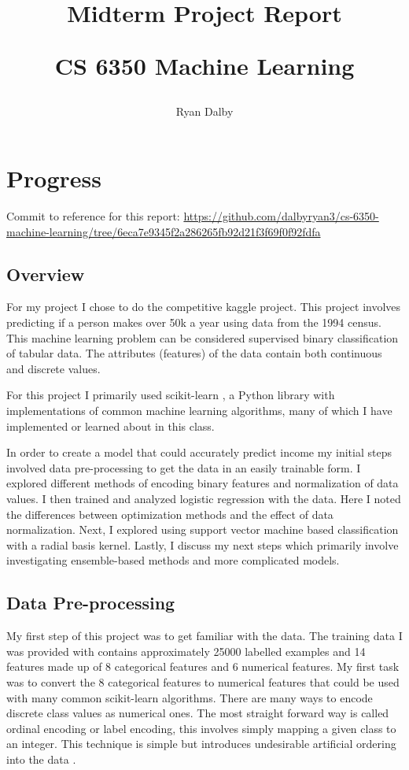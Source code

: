 \documentclass[11pt]{article}
\title{
    Midterm Project Report

    \large{
    CS 6350 Machine Learning
    }  
    
}
\author{
    Ryan Dalby
}
\date{\displaydate{date}}
\begin{document}
\maketitle

\section*{Progress}
Commit to reference for this report: \url{https://github.com/dalbyryan3/cs-6350-machine-learning/tree/6eca7e9345f2a286265fb92d21f3f69f0f92fdfa}

\subsection*{Overview}

For my project I chose to do the competitive kaggle project.
This project involves predicting if a person makes over 50k a year using data from the 1994 census. 
This machine learning problem can be considered supervised binary classification of tabular data. 
The attributes (features) of the data contain both continuous and discrete values.

For this project I primarily used scikit-learn \cite{noauthor_scikit-learn_nodate}, a Python library with implementations of common machine learning algorithms, many of which I have implemented or learned about in this class.

In order to create a model that could accurately predict income my initial steps involved data pre-processing to get the data in an easily trainable form.
I explored different methods of encoding binary features and normalization of data values.
I then trained and analyzed logistic regression with the data. 
Here I noted the differences between optimization methods and the effect of data normalization.
Next, I explored using support vector machine based classification with a radial basis kernel.
Lastly, I discuss my next steps which primarily involve investigating ensemble-based methods and more complicated models.

\subsection*{Data Pre-processing}
My first step of this project was to get familiar with the data.
The training data I was provided with contains approximately 25000 labelled examples and 14 features made up of 8 categorical features and 6 numerical features.
My first task was to convert the 8 categorical features to numerical features that could be used with many common scikit-learn algorithms.
There are many ways to encode discrete class values as numerical ones.
The most straight forward way is called ordinal encoding or label encoding, this involves simply mapping a given class to an integer.
This technique is simple but introduces undesirable artificial ordering into the data \cite{hancock_survey_2020}.
\end{document}
